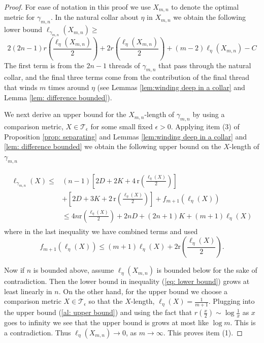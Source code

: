 \documentclass[12pt]{amsart}
\numberwithin{equation}{section}
\theoremstyle{plain}
\begin{document}
\begin{proof} For ease of notation in this proof we use $X_{m,n}$ to denote the optimal metric for $\gamma_{m,n}$.
In  the natural collar about 
$\eta$ in  $X_{m,n}$ we obtain the following lower bound 
$\ell_{\gamma_{m,n}}(X_{m,n}) \geq $
\begin{equation}\label{eq: lower bound}
 2(2n-1) r\left(\frac{\ell_{\eta}(X_{m,n})}{2}\right)
+2  r\left(\frac{\ell_{\eta}(X_{m,n})}{2}\right)
+(m-2) \ell_{\eta}(X_{m,n}) -C
\end{equation}
The first term is from the $2n-1$ threads of $\gamma_{m,n}$ that pass through the natural collar, and the final three terms come from the contribution of the final thread that winds $m$ times around $\eta$ (see Lemmas
\ref{lem:winding deep in a collar} and Lemma
\ref{lem: difference bounded}). 

We next derive an upper bound for the  $X_{m,n}$-length of $\gamma_{m,n}$ by using a comparison metric, $X  \in 
\mathcal{T}_{\epsilon}$ for some small fixed $\epsilon >0$. Applying item (3) of Proposition \ref{prop: separating}
and Lemmas \ref{lem:winding deep in a collar} and 
\ref{lem: difference bounded} we obtain the following upper bound on the $X$-length of $\gamma_{m,n}$


\begin{align}\label{al: upper bound}
 \begin{split}
    \ell_{\gamma_{m,n}}(X) \leq & 
 (n-1)\left[2D+ 2K +4\, \text{r}\left(\frac{\ell_{\eta}(X)}{2}\right)   \right]\\
    &+\left[2D+ 3K +2\, \text{r}\left(\frac{\ell_{\eta}(X)}{2}\right)   \right]+ f_{m+1}(\ell_{\eta}(X)) \\
   &\leq  4n \text{r}\left(\frac{\ell_{\eta}(X)}{2}\right)  +2nD+(2n+1)K+(m+1)\ell_{\eta}(X)
   \end{split}
 \end{align}
where in the last inequality we have combined terms and used 
$$
f_{m+1}(\ell_{\eta}(X))\leq (m+1)\ell_{\eta}(X) +2\text{r}\left(\frac{\ell_{\eta}(X)}{2}\right).
$$

Now if $n$ is bounded above,  assume  $\ell_{\eta}(X_{m,n})$ is bounded below for the sake of contradiction. 
  Then   the lower bound  in inequality (\ref{eq: lower bound}) grows at least linearly in $n$.
  On the other hand, for the upper bound we choose a comparison metric $X \in \mathcal{T}_{\epsilon}$ so that   the $X$-length, $\ell_{\eta}(X)=\frac{1}{m+1}$.  Plugging into the  upper bound  (\ref{al: upper bound}) 
  and using the fact that $r(\frac{x}{2}) \sim \log \frac{1}{x}$ as $x$ goes to infinity we see that the upper bound is grows at most like $\log m$. This is a contradiction. Thus 
  $\ell_{\eta}(X_{m,n}) \rightarrow 0$, as $m \rightarrow \infty$. This proves item (1).


\end{proof}
\end{document}
